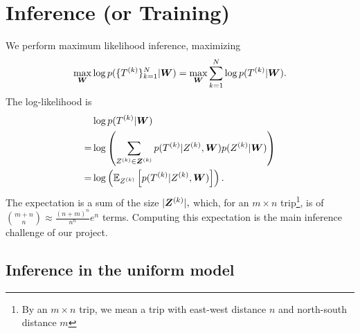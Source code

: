 \documentclass{article}
\begin{document}


\section{Inference (or Training)}
\label{sec:inference}
We perform maximum likelihood inference, maximizing \[
\max_{\bm W} \log p(\{T^{(k)}\}_{k=1}^N|\bm W) = \max_{\bm W} \sum_{k=1}^N \log p(T^{(k)} | \bm W).
\]
The log-likelihood is 
\begin{align*}
&\log p (T^{(k)} | \bm W) \\
=& \log\left({\sum_{Z^{(k)} \in \bm Z^{(k)}} p(T^{(k)}|Z^{(k)},\bm W)p(Z^{(k)}|\bm W)}\right) \\
=& \log\left({\mathbb{E}_{Z^{(k)}}\left[{p(T^{(k)}|Z^{(k)},\bm W)}\right]}\right).
\end{align*}
The expectation is a sum of the size $|\bm Z^{(k)}|,$ which, for an $m\times n$ trip\footnote{By an $m\times n$ trip, we mean a trip with east-west distance $n$ and north-south distance $m$}, is of $\binom{m+n}{n} \approx \frac{(n+m)^n}{n^n}e^n$ terms. Computing this expectation is the main inference challenge of our project.

\subsection{Inference in the uniform model}
\end{document}
